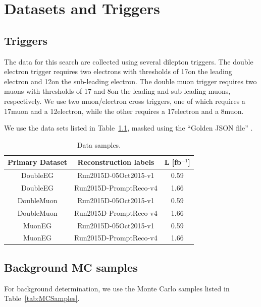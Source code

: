 \chapter{Datasets and Triggers}
\label{chap:Samples}

\section{Triggers}
The data for this search are collected using several dilepton triggers. The double electron trigger requires two electrons with \pt thresholds of 17\GeV on the leading electron and 12\GeV on the sub-leading electron. The double muon trigger requires two muons with \pt thresholds of 17 and 8\GeV on the leading and sub-leading muons, respectively. We use two muon/electron cross triggers, one of which requires a 17\GeV muon and a 12\GeV electron, while the other requires a 17\GeV electron and a 8\GeV muon.

We use the data sets listed in Table~\ref{tab:DataSamples}, masked using the ``Golden JSON file'' .

\begin{table}
\centering
\caption{Data samples.} \label{tab:DataSamples}
\begin{tabular}{c c c}
\hline\hline
Primary Dataset & Reconstruction labels & L [fb$^{-1}$]\\
\hline
DoubleEG & Run2015D-05Oct2015-v1 & 0.59\\
DoubleEG & Run2015D-PromptReco-v4 & 1.66\\
\hline
DoubleMuon & Run2015D-05Oct2015-v1 & 0.59\\
DoubleMuon & Run2015D-PromptReco-v4 & 1.66\\
\hline
MuonEG & Run2015D-05Oct2015-v1 & 0.59\\
MuonEG & Run2015D-PromptReco-v4 & 1.66\\
\end{tabular}
\end{table}


\section{Background MC samples}
For background determination, we use the Monte Carlo samples listed in Table~\ref{tab:MCSamples}.

